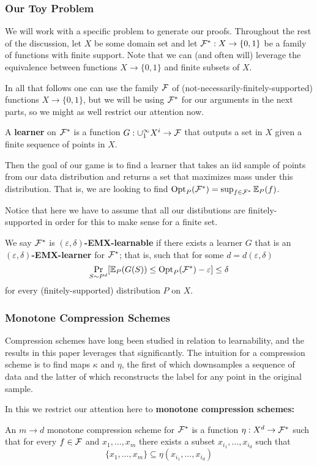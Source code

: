 \documentclass[12pt]{article}
\begin{document}
\subsubsection{Our Toy Problem}
We will work with a specific problem to generate our proofs. Throughout the rest of the discussion, let $X$ be some domain set and let $\mathcal{F}^\ast:X\to\{0,1\}$ be a family of functions with finite support. Note that we can (and often will) leverage the 
equivalence between functions $X\to\{0,1\}$ and finite subsets of $X$. 
\begin{rmk}
	In all that follows one can use the family $\mathcal{F}$ of (not-necessarily-finitely-supported) functions $X\to\{0,1\}$, but we will be using $\mathcal{F}^\ast$ for our arguments in the next parts, so we might as well restrict our attention now.
\end{rmk}
\begin{defn}
	A \textbf{learner} on $\mathcal{F}^\ast$ is a function $G:\cup_1^\infty X^i\to \mathcal{F}$ that outputs a set in $X$ given a finite sequence of points in $X$.
\end{defn}
Then the goal of our game is to find a learner that takes an iid sample of points from our data distribution and returns a set that maximizes mass under this distribution.
That is, we are looking to find $\operatorname{Opt}_P(\mathcal{F}^\ast)=\sup_{f\in\mathcal{F}^\ast}\mathbb{E}_P(f)$.
\begin{rmk}
	Notice that here we have to assume that all our distibutions are finitely-supported in order for this to make sense for a finite set.
\end{rmk}
\begin{defn}
	We say $\mathcal{F}^\ast$ is \textbf{$(\varepsilon,\delta)$-EMX-learnable} if there exists a learner $G$ that is an \textbf{$(\varepsilon,\delta)$-EMX-learner} for $\mathcal{F}^\ast$; that is, such that 
	for some $d=d(\varepsilon,\delta)$
	\[\operatorname*{Pr}_{S\sim P^d}[\mathbb{E}_P(G(S))\le\mathrm{Opt}_P(\mathcal{F}^\ast)-\varepsilon]\le\delta\]
	for every (finitely-supported) distribution $P$ on $X$.
\end{defn}

\subsubsection{Monotone Compression Schemes}
Compression schemes have long been studied in relation to learnability, and the results in this paper leverages that significantly.
The intuition for a compression scheme is to find maps $\kappa$ and $\eta$, the first of which downsamples a sequence of data and the latter of which reconstructs the label for any point in the original sample.

In this we restrict our attention here to \textbf{monotone compression schemes:}
\begin{defn}
	An $m\to d$ monotone compression scheme for $\mathcal{F}^\ast$ is a function $\eta:X^d\to\mathcal{F}^\ast$ such that for every $f\in\mathcal{F}$ and $x_1,\dots,x_m$ there exists 
	a subset $x_{i_1},\dots,x_{i_d}$ such that 
	\[\{x_1,\dots,x_m\}\subseteq \eta(x_{i_1},\dots,x_{i_d})\]
\end{defn}
\end{document}

